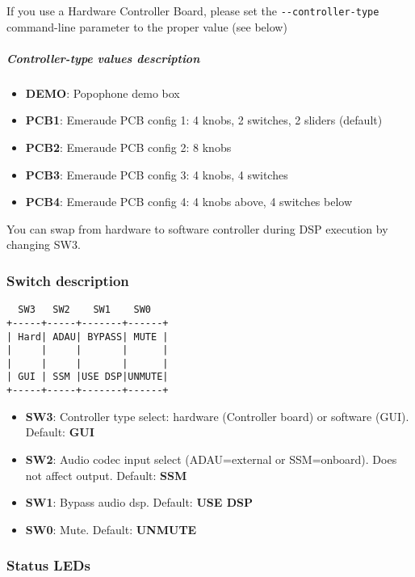 If you use a Hardware Controller Board, please set the
\texttt{-\/-controller-type} command-line parameter to the proper value
(see below)

\hypertarget{controller-type-values-description}{%
\subparagraph{Controller-type values
description}\label{controller-type-values-description}}

\begin{itemize}

\item
  \textbf{DEMO}: Popophone demo box
\item
  \textbf{PCB1}: Emeraude PCB config 1: 4 knobs, 2 switches, 2 sliders
  (default)
\item
  \textbf{PCB2}: Emeraude PCB config 2: 8 knobs
\item
  \textbf{PCB3}: Emeraude PCB config 3: 4 knobs, 4 switches
\item
  \textbf{PCB4}: Emeraude PCB config 4: 4 knobs above, 4 switches below
\end{itemize}

You can swap from hardware to software controller during DSP execution
by changing SW3.

\hypertarget{switch-description}{%
\subsubsection{Switch description}\label{switch-description}}

\begin{verbatim}
  SW3   SW2    SW1    SW0
+-----+-----+-------+------+
| Hard| ADAU| BYPASS| MUTE |
|     |     |       |      |
|     |     |       |      |
| GUI | SSM |USE DSP|UNMUTE|
+-----+-----+-------+------+
\end{verbatim}
\begin{itemize}

\item
  \textbf{SW3}: Controller type select: hardware (Controller board) or
  software (GUI). Default: {\bf GUI}
\item
  \textbf{SW2}: Audio codec input select (ADAU=external or SSM=onboard).
  Does not affect output. Default: \textbf{SSM}
\item
  \textbf{SW1}: Bypass audio dsp. Default: \textbf{USE DSP}
\item
  \textbf{SW0}: Mute. Default: \textbf{UNMUTE}
\end{itemize}

\hypertarget{status-leds}{%
\subsubsection{Status LEDs}\label{status-leds}}

